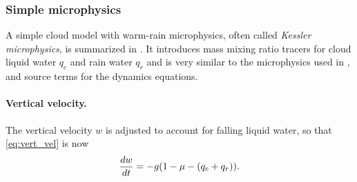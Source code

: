 %
%


\subsubsection{Simple microphysics}

A simple cloud model with warm-rain microphysics, often called \emph{Kessler microphysics}, is summarized in \cite[ch.~15]{RogersYau}.
It introduces mass mixing ratio tracers for cloud liquid water $q_c$ and rain water $q_r$ and is very similar to the microphysics used in \cite{SoongOgura1973,KlempWilhelmson1978}, and source terms for the dynamics equations.

\paragraph{Vertical velocity.} The vertical velocity $w$ is adjusted to account for falling liquid water, so that \eqref{eq:vert_vel} is now
\begin{equation*}
  \frac{ d w}{d t} = -g(1-\mu -(q_c+q_r)).  
\end{equation*}


